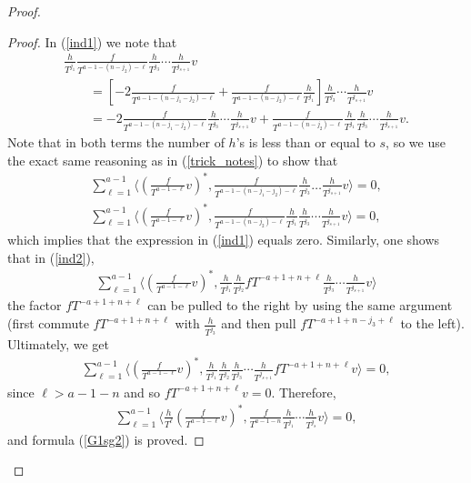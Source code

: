 \documentclass[pdftex]{sigma}
\numberwithin{equation}{section}
\begin{document}
\begin{proof}
\begin{proof}
In (\ref{ind1}) we note that
\begin{gather*}
\frac{h}{T^{j_1}} \frac{f}{T^{a-1 - (n-j_2) - \ell}} \frac{h}{T^{j_3}} \cdots\frac{h}{T^{j_{s+1}}}v \\
\qquad{} = \left[ -2 \frac{f}{T^{a-1 - (n-j_1-j_2) - \ell}} + \frac{f}{T^{a-1 - (n-j_2) - \ell}}\frac{h}{T^{j_1}} \right] \frac{h}{T^{j_3}} \cdots\frac{h}{T^{j_{s+1}}}v \\
\qquad{} = -2 \frac{f}{T^{a-1 - (n-j_1-j_2) - \ell}} \frac{h}{T^{j_3}} \cdots\frac{h}{T^{j_{s+1}}}v + \frac{f}{T^{a-1 - (n-j_2) - \ell}}\frac{h}{T^{j_1}} \frac{h}{T^{j_3}} \cdots\frac{h}{T^{j_{s+1}}}v.
\end{gather*}
Note that in both terms the number of $h$'s is less than or equal to $s$, so we use the exact same reasoning as in (\ref{trick_notes}) to show that
\begin{gather*}
\sum_{\ell=1}^{a-1} \bigg\langle \left(\frac{f}{T^{a-1-\ell}}v\right)^*, \frac{f}{T^{a-1 - (n-j_1-j_2) - \ell}} \frac{h}{T^{j_3}} \dots\frac{h}{T^{j_{s+1}}}v \bigg\rangle = 0, \\
\sum_{\ell=1}^{a-1} \bigg\langle \left(\frac{f}{T^{a-1-\ell}}v\right)^*, \frac{f}{T^{a-1 - (n-j_2) - \ell}}\frac{h}{T^{j_1}} \frac{h}{T^{j_3}} \cdots\frac{h}{T^{j_{s+1}}}v \bigg\rangle = 0,
\end{gather*}
which implies that the expression in (\ref{ind1}) equals zero. Similarly, one shows that in (\ref{ind2}),
\begin{gather*}
\sum_{\ell=1}^{a-1} \bigg\langle \left(\frac{f}{T^{a-1-\ell}}v\right)^*, \frac{h}{T^{j_1}} \frac{h}{T^{j_2}} fT^{-a+1 + n + \ell} \frac{h}{T^{j_3}} \cdots\frac{h}{T^{j_{s+1}}}v \bigg\rangle
\end{gather*}
the factor $fT^{-a+1 + n + \ell}$ can be pulled to the right by using the same argument (first commute $fT^{-a+1 + n + \ell}$ with $\frac{h}{T^{j_3}}$ and then pull $fT^{-a+1 + n-j_3 + \ell}$ to the left). Ultimately, we get
\begin{gather*}
\sum_{\ell=1}^{a-1} \bigg\langle \left(\frac{f}{T^{a-1-\ell}}v\right)^*, \frac{h}{T^{j_1}} \frac{h}{T^{j_2}} \frac{h}{T^{j_3}} \cdots\frac{h}{T^{j_{s+1}}} fT^{-a+1 + n + \ell} v \bigg\rangle = 0,
\end{gather*}
since $\ell > a-1-n$ and so $fT^{-a+1 + n + \ell} v = 0$. Therefore,
\begin{gather*}
\sum_{\ell=1}^{a-1} \bigg\langle \frac{h}{T^{\ell}} \left(\frac{f}{T^{a-1-\ell}}v\right)^*, \frac{f}{T^{a-1-n}} \frac{h}{T^{j_1}}\cdots\frac{h}{T^{j_{s}}} v \bigg\rangle = 0,
\end{gather*}
and formula (\ref{G1sg2}) is proved.


\end{proof}
\end{proof}
\end{document}
